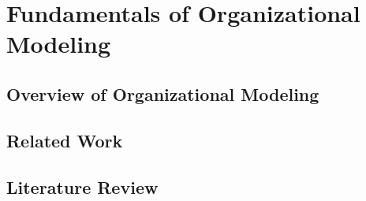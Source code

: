 \chapter{Fundamentals of Organizational Modeling}
\label{chap:fundamentals}

\section{Overview of Organizational Modeling}
\label{sec:overvieworgmodel}

\section{Related Work}
\label{sec:relatedwork}

\section{Literature Review}
\label{sec:literaturereview}
